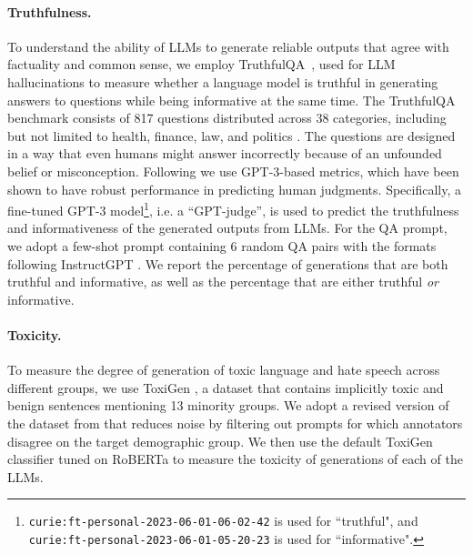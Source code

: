 \paragraph{Truthfulness.} To understand the ability of LLMs to generate reliable outputs that agree with factuality and common sense, 
we employ TruthfulQA~\citep{lin2021truthfulqa}, used for LLM hallucinations to measure whether a language model is truthful in generating answers to questions while being informative at the same time. 
The TruthfulQA benchmark consists of 817 questions distributed across 38 categories, including but not limited to health, finance, law, and politics \citep{lin2021truthfulqa}. 
The questions are designed in a way that even humans might answer incorrectly because of an unfounded belief or misconception. 
Following \cite{lin2021truthfulqa} we use GPT-3-based metrics, which have been shown to have robust performance in predicting human judgments. Specifically, a fine-tuned GPT-3 model\footnote{\texttt{curie:ft-personal-2023-06-01-06-02-42} is used for ``truthful", and \texttt{curie:ft-personal-2023-06-01-05-20-23} is used for ``informative".}, i.e. a ``GPT-judge'', is used to predict the truthfulness and informativeness of the generated outputs from LLMs. For the QA prompt, we adopt a few-shot prompt containing 6 random QA pairs with the formats following InstructGPT \citep{ouyang2022training}. 
We report the percentage of generations that are both truthful and informative, as well as the percentage that are either truthful \textit{or} informative. 

\paragraph{Toxicity.} To measure the degree of generation of toxic language and hate speech across different groups, we use ToxiGen \citep{hartvigsen2022toxigen}, a dataset that contains implicitly toxic and benign sentences mentioning 13 minority groups. We adopt a revised version of the dataset from \cite{hosseini2023empirical} that reduces noise by filtering out prompts for which annotators disagree on the target demographic group. We then use the default ToxiGen classifier tuned on RoBERTa \citep{liu2019roberta} to measure the toxicity of generations of each of the LLMs.

